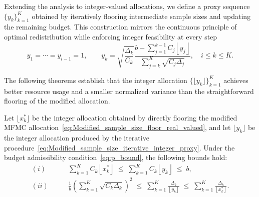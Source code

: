 Extending the analysis to integer‐valued allocations, we define a proxy sequence 
$\{y_k\}_{k=1}^K$ obtained by iteratively flooring intermediate sample sizes and 
updating the remaining budget. This construction mirrors the continuous principle 
of optimal redistribution while enforcing integer feasibility at every step
%
\begin{equation}
    \label{eq:Modified_sample_size_iterative_integer_proxy}
    y_1=\cdots=y_{i-1}=1, \qquad 
    y_k=\sqrt{\frac{\Delta_k}{C_k}}
    \frac{b-\sum_{j=1}^{k-1} C_j\left\lfloor y_j\right\rfloor}
         {\sum_{j=k}^{K}\sqrt{C_j\Delta_j}}, \quad i\le k\le K.
\end{equation}
%

The following theorems establish that the integer allocation $\{\lfloor y_k \rfloor\}_{k=1}^K$ achieves better resource usage and a smaller normalized variance than the straightforward flooring of the modified allocation.

\begin{theorem}
\label{thm:MFMC_modified_integer_cost}
Let $\lfloor x_k^* \rfloor$ be the integer allocation obtained by directly 
flooring the modified MFMC allocation~\eqref{eq:Modified_sample_size_floor_real_valued}, 
and let $\lfloor y_k \rfloor$ be the integer allocation produced by the iterative 
procedure~\eqref{eq:Modified_sample_size_iterative_integer_proxy}. Under the 
budget admissibility condition~\eqref{eq:p_bound}, the following bounds hold:
%
\begin{align*}
    (i)\qquad &
    \sum_{k=1}^K C_k \left\lfloor x_k^* \right\rfloor
    \;\le\; 
    \sum_{k=1}^K C_k\left\lfloor y_k \right\rfloor
    \;\le\; b,\\[4pt]
    (ii)\qquad &
    \frac{1}{b}\left(\sum_{k=1}^K\sqrt{C_k\Delta_k}\right)^2
    \;\le\;
    \sum_{k=1}^K \frac{\Delta_k}{\left\lfloor y_k \right\rfloor}
    \;\le\;
    \sum_{k=1}^K \frac{\Delta_k}{\left\lfloor x_k^* \right\rfloor}.
\end{align*}
%
\end{theorem}







